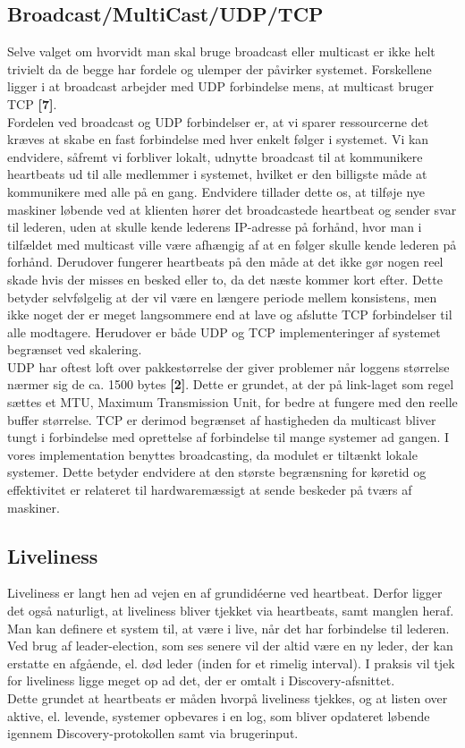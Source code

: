 \documentclass[a4paper,12pt]{article}
\begin{document}
\subsection{Broadcast/MultiCast/UDP/TCP}
Selve valget om hvorvidt man skal bruge broadcast eller multicast er ikke helt trivielt da de begge har fordele og ulemper der påvirker systemet. Forskellene ligger i at broadcast arbejder med UDP forbindelse mens, at multicast bruger TCP \textbf{[7]}.
\\
Fordelen ved broadcast og UDP forbindelser er, at vi sparer ressourcerne det kræves at skabe en fast forbindelse med hver enkelt følger i systemet. Vi kan endvidere, såfremt vi forbliver lokalt, udnytte broadcast til at kommunikere heartbeats ud til alle medlemmer i systemet, hvilket er den billigste måde at kommunikere med alle på en gang. Endvidere tillader dette os, at tilføje nye maskiner løbende ved at klienten hører det broadcastede heartbeat og sender svar til lederen, uden at skulle kende lederens IP-adresse på forhånd, hvor man i tilfældet med multicast ville være afhængig af at en følger skulle kende lederen på forhånd. Derudover fungerer heartbeats på den måde at det ikke gør nogen reel skade hvis der misses en besked eller to, da det næste kommer kort efter. Dette betyder selvfølgelig at der vil være en længere periode mellem konsistens, men ikke noget der er meget langsommere end at lave og afslutte TCP forbindelser til alle modtagere.
Herudover er både UDP og TCP implementeringer af systemet begrænset ved skalering.
\\[5px]
UDP har oftest loft over pakkestørrelse der giver problemer når loggens størrelse nærmer sig de ca. 1500 bytes \textbf{[2]}. Dette er grundet, at der på link-laget som regel sættes et MTU, Maximum Transmission Unit, for bedre at fungere med den reelle buffer størrelse. TCP er derimod begrænset af hastigheden da multicast bliver tungt i forbindelse med oprettelse af forbindelse til mange systemer ad gangen. 
I vores implementation benyttes broadcasting, da modulet er tiltænkt lokale systemer.
Dette betyder endvidere at den største begrænsning for køretid og effektivitet er relateret til hardwaremæssigt at sende beskeder på tværs af maskiner.

\subsection{Liveliness} 
Liveliness er langt hen ad vejen en af grundidéerne ved heartbeat. Derfor ligger det også naturligt, at liveliness bliver tjekket via heartbeats, samt manglen heraf. Man kan definere et system til, at være i live, når det har forbindelse til lederen. Ved brug af leader-election, som ses senere vil der altid være en ny leder, der kan erstatte en afgående, el. død leder (inden for et rimelig interval). I praksis vil tjek for liveliness ligge meget op ad det, der er omtalt i Discovery-afsnittet.
\\
Dette grundet at heartbeats er måden hvorpå liveliness tjekkes, og at listen over aktive, el. levende, systemer opbevares i en log, som bliver opdateret løbende igennem Discovery-protokollen samt via brugerinput.
\end{document}

